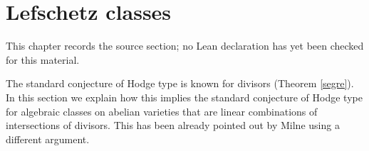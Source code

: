 \chapter{Lefschetz classes}
\label{standard-conjectures-abelian-fourfolds-chapter-05}

\begin{remark}
\label{standard-conjectures-abelian-fourfolds-chapter-05-source}
This chapter records the source section; no Lean declaration has yet been checked for this material.
\notready
\end{remark}

\label{sectionlefschetz}
The standard conjecture of Hodge type is known for divisors (Theorem \ref{segre}). In this section we explain how this implies the standard conjecture of Hodge type   for algebraic classes on abelian varieties that are linear combinations of intersections of divisors. This has been already pointed out by Milne \cite[Remark 3.7]{pola} using a different argument.

